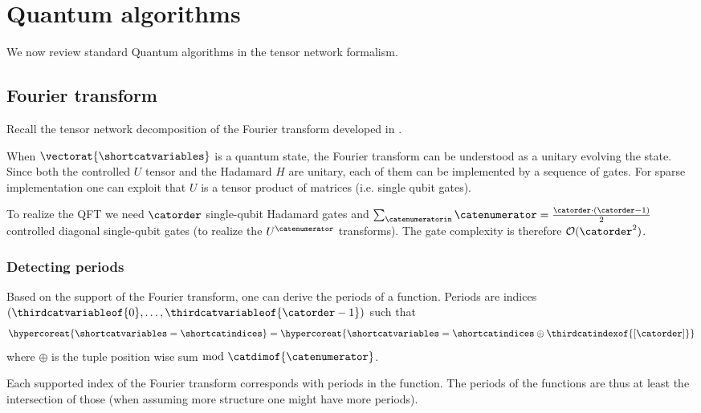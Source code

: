 \section{Quantum algorithms}

We now review standard Quantum algorithms in the tensor network formalism.

\subsection{Fourier transform}

Recall the tensor network decomposition of the Fourier transform developed in .

When $\vectorat{\shortcatvariables}$ is a quantum state, the Fourier transform can be understood as a unitary evolving the state.
Since both the controlled $U$ tensor and the Hadamard $H$ are unitary, each of them can be implemented by a sequence of gates.
For sparse implementation one can exploit that $U$ is a tensor product of matrices (i.e. single qubit gates).

To realize the QFT we need $\catorder$ single-qubit Hadamard gates and $\sum_{\catenumeratorin} \catenumerator = \frac{\catorder\cdot(\catorder-1)}{2}$ controlled diagonal single-qubit gates (to realize the $U^{\catenumerator}$ transforms).
The gate complexity is therefore $\mathcal{O}(\catorder^2)$.



\subsubsection{Detecting periods}

Based on the support of the Fourier transform, one can derive the periods of a function.
Periods are indices $(\thirdcatvariableof{0},\ldots,\thirdcatvariableof{\catorder-1})$ such that
\begin{align*}
    \hypercoreat{\shortcatvariables=\shortcatindices}
    = \hypercoreat{\shortcatvariables=\shortcatindices\oplus\thirdcatindexof{[\catorder]}}
\end{align*}
where $\oplus$ is the tuple position wise sum $\mathrm{mod}\,\,\catdimof{\catenumerator}$.


Each supported index of the Fourier transform corresponds with periods in the function.
The periods of the functions are thus at least the intersection of those (when assuming more structure one might have more periods).

